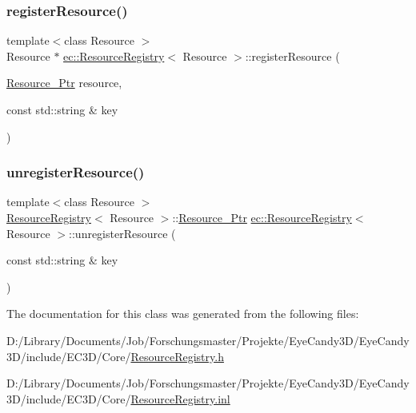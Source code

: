 \subsubsection{\texorpdfstring{register\+Resource()}{registerResource()}}
{\footnotesize\ttfamily template$<$class Resource $>$ \\
Resource $\ast$ \mbox{\hyperlink{classec_1_1_resource_registry}{ec\+::\+Resource\+Registry}}$<$ Resource $>$\+::register\+Resource (\begin{DoxyParamCaption}\item[{\mbox{\hyperlink{classec_1_1_resource_registry_a77cf5381229bff47d251603c783115fe}{Resource\+\_\+\+Ptr}}}]{resource,  }\item[{const std\+::string \&}]{key }\end{DoxyParamCaption})}

\mbox{\label{classec_1_1_resource_registry_ae1227f72ea04032d4e757ac4b5b0845a}} 
\subsubsection{\texorpdfstring{unregister\+Resource()}{unregisterResource()}}
{\footnotesize\ttfamily template$<$class Resource $>$ \\
\mbox{\hyperlink{classec_1_1_resource_registry}{Resource\+Registry}}$<$ Resource $>$\+::\mbox{\hyperlink{classec_1_1_resource_registry_a77cf5381229bff47d251603c783115fe}{Resource\+\_\+\+Ptr}} \mbox{\hyperlink{classec_1_1_resource_registry}{ec\+::\+Resource\+Registry}}$<$ Resource $>$\+::unregister\+Resource (\begin{DoxyParamCaption}\item[{const std\+::string \&}]{key }\end{DoxyParamCaption})}



The documentation for this class was generated from the following files\+:\begin{DoxyCompactItemize}
\item 
D\+:/\+Library/\+Documents/\+Job/\+Forschungsmaster/\+Projekte/\+Eye\+Candy3\+D/\+Eye\+Candy3\+D/include/\+E\+C3\+D/\+Core/\mbox{\hyperlink{_resource_registry_8h}{Resource\+Registry.\+h}}\item 
D\+:/\+Library/\+Documents/\+Job/\+Forschungsmaster/\+Projekte/\+Eye\+Candy3\+D/\+Eye\+Candy3\+D/include/\+E\+C3\+D/\+Core/\mbox{\hyperlink{_resource_registry_8inl}{Resource\+Registry.\+inl}}\end{DoxyCompactItemize}
